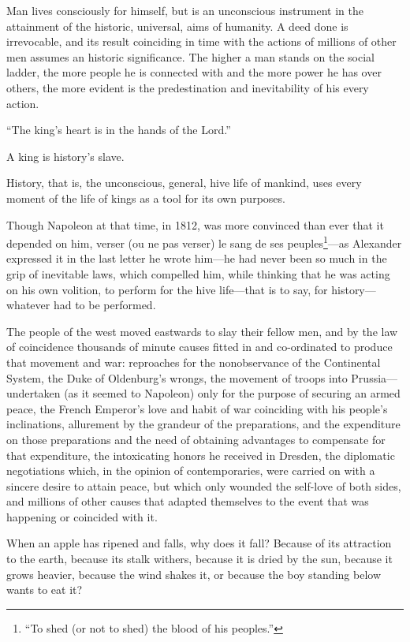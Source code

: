 Man lives consciously for himself, but is an unconscious
instrument in the attainment of the historic, universal, aims of
humanity. A deed done is irrevocable, and its result coinciding
in time with the actions of millions of other men assumes an
historic significance. The higher a man stands on the social
ladder, the more people he is connected with and the more power
he has over others, the more evident is the predestination and
inevitability of his every action.

``The king's heart is in the hands of the Lord.''

A king is history's slave.

History, that is, the unconscious, general, hive life of mankind,
uses every moment of the life of kings as a tool for its own
purposes.

Though Napoleon at that time, in 1812, was more convinced than
ever that it depended on him, verser (ou ne pas verser) le sang
de ses peuples\footnote{``To shed (or not to shed) the blood of
his peoples.”}---as Alexander expressed it in the last letter he
wrote him---he had never been so much in the grip of inevitable
laws, which compelled him, while thinking that he was acting on
his own volition, to perform for the hive life---that is to say,
for history---whatever had to be performed.

The people of the west moved eastwards to slay their fellow men,
and by the law of coincidence thousands of minute causes fitted
in and co-ordinated to produce that movement and war: reproaches
for the nonobservance of the Continental System, the Duke of
Oldenburg's wrongs, the movement of troops into
Prussia---undertaken (as it seemed to Napoleon) only for the
purpose of securing an armed peace, the French Emperor's love and
habit of war coinciding with his people's inclinations,
allurement by the grandeur of the preparations, and the
expenditure on those preparations and the need of obtaining
advantages to compensate for that expenditure, the intoxicating
honors he received in Dresden, the diplomatic negotiations which,
in the opinion of contemporaries, were carried on with a sincere
desire to attain peace, but which only wounded the self-love of
both sides, and millions of other causes that adapted themselves
to the event that was happening or coincided with it.

When an apple has ripened and falls, why does it fall? Because of
its attraction to the earth, because its stalk withers, because
it is dried by the sun, because it grows heavier, because the
wind shakes it, or because the boy standing below wants to eat
it?

